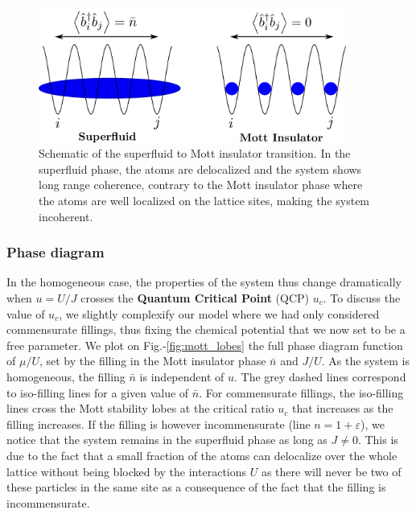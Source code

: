 \begin{figure}
    \centering
    \includegraphics[width=0.9\textwidth]{Fig/Chapter2/schema_superfluid_mott.png}
    \caption[Schematic of the superfluid to Mott insulator transition]{Schematic of the superfluid to Mott insulator transition. In the superfluid phase, the atoms are delocalized and the system shows long range coherence, contrary to the Mott insulator phase where the atoms are well localized on the lattice sites, making the system incoherent.}
    \label{fig:my_label}
\end{figure}

\subsubsection{Phase diagram}

In the homogeneous case, the properties of the system thus change dramatically when $u=U/J$ crosses the \textbf{Quantum Critical Point} (QCP) $u_c$. To discuss the value of $u_c$, we slightly complexify our model where we had only considered commensurate fillings, thus fixing the chemical potential that we now set to be a free parameter. We plot on Fig.-\ref{fig:mott_lobes} the full phase diagram function of $\mu/U$, set by the filling in the Mott insulator phase $\bar{n}$ and $J/U$. As the system is homogeneous, the filling $\bar{n}$ is independent of $u$. The grey dashed lines correspond to iso-filling lines for a given value of $\bar{n}$. For commensurate fillings, the iso-filling lines cross the Mott stability lobes at the critical ratio $u_c$ that increases as the filling increases. If the filling is however incommensurate (line $n=1+\varepsilon$), we notice that the system remains in the superfluid phase as long as $J \neq 0$. This is due to the fact that a small fraction of the atoms can delocalize over the whole lattice without being blocked by the interactions $U$ as there will never be two of these particles in the same site as a consequence of the fact that the filling is incommensurate.

